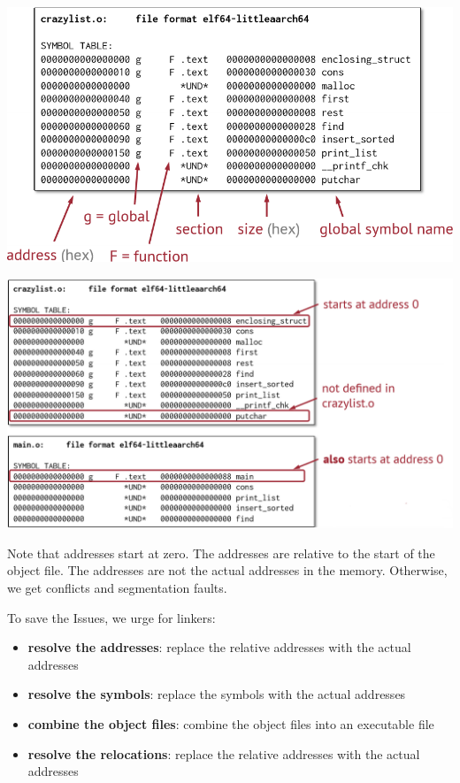 \documentclass[letterpaper,12pt]{article}
\begin{document}
\includegraphics*[scale = 0.8]{./Images/crazylist object.png}

\includegraphics*[scale = 0.7]{./Images/main object.png}

Note that addresses start at zero. The addresses are relative to the start of the object file. The addresses are not the actual addresses in the memory. Otherwise, we get conflicts and segmentation faults.

To save the Issues, we urge for linkers:\begin{itemize}
    \item \textbf{resolve the addresses}: replace the relative addresses with the actual addresses
    \item \textbf{resolve the symbols}: replace the symbols with the actual addresses
    \item \textbf{combine the object files}: combine the object files into an executable file
    \item \textbf{resolve the relocations}: replace the relative addresses with the actual addresses
\end{itemize}
\end{document}
